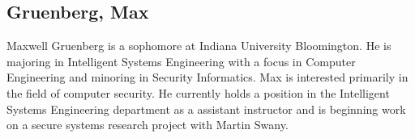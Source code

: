 \subsection{Gruenberg, Max}
Maxwell Gruenberg is a sophomore at Indiana University Bloomington. He is majoring in Intelligent Systems Engineering with a focus in Computer Engineering and minoring in Security Informatics. Max is interested primarily in the field of computer security. He currently holds a position in the Intelligent Systems Engineering department as a assistant instructor and is beginning work on a secure systems research project with Martin Swany.

